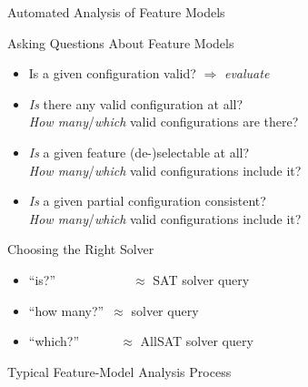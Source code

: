 \begin{frame}{Automated Analysis of Feature Models}
	\begin{mycolumns}[widths={52}]
		\begin{example}{Asking Questions About Feature Models}
			\begin{itemize}
				\item Is a given configuration valid? $\Rightarrow$ \emph{evaluate}
				\item \emph{Is} there any valid configuration at all?\\
					\emph{How many}/\emph{which} valid configurations are there?\\
				\item \emph{Is} a given feature (de-)selectable at all?\\
					\emph{How many}/\emph{which} valid configurations include it?\\
				\item \emph{Is} a given partial configuration consistent?\\
					\emph{How many}/\emph{which} valid configurations include it?\\
			\end{itemize}
		\end{example}
		\begin{note}{Choosing the Right Solver}
			\begin{itemize}
				\item ``is?''~~~~~~~~~~~~$\approx$ SAT solver query
				\item ``how many?''~$\approx$ \ssat{} solver query
				\item ``which?''~~~~~~\,$\approx$ AllSAT solver query
			\end{itemize}
		\end{note}
	\mynextcolumn
		\begin{definition}{Typical Feature-Model Analysis Process}
			\centering
\end{definition}
\end{mycolumns}
\end{frame}
